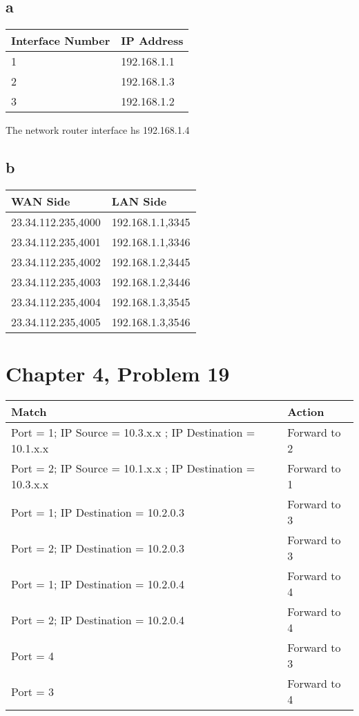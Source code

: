\documentclass{article}
\begin{document}
\subsection*{a}
\begin{tabular}{ |l|l| }
  \hline
  Interface Number & IP Address \\ \hline
      1 & 192.168.1.1 \\ \hline
      2 & 192.168.1.3 \\ \hline
      3 & 192.168.1.2 \\ \hline
\end{tabular}
\newline
The network router interface hs 192.168.1.4\\

\subsection*{b}
\begin{tabular}{ |l|l| }
  \hline
  WAN Side & LAN Side \\ \hline
      23.34.112.235,4000 & 192.168.1.1,3345 \\ \hline
      23.34.112.235,4001 & 192.168.1.1,3346 \\ \hline
      23.34.112.235,4002 & 192.168.1.2,3445 \\ \hline
      23.34.112.235,4003 & 192.168.1.2,3446 \\ \hline
      23.34.112.235,4004 & 192.168.1.3,3545 \\ \hline
      23.34.112.235,4005 & 192.168.1.3,3546 \\ \hline
\end{tabular}

\section*{Chapter 4, Problem 19}
\begin{tabular}{ |l|l| }
  \hline
  Match & Action \\ \hline
      Port = 1; IP Source = 10.3.x.x ; IP Destination = 10.1.x.x & Forward to 2 \\ \hline
      Port = 2; IP Source = 10.1.x.x ; IP Destination = 10.3.x.x & Forward to 1 \\ \hline
      Port = 1; IP Destination = 10.2.0.3 & Forward to 3 \\ \hline
      Port = 2; IP Destination = 10.2.0.3 & Forward to 3 \\ \hline
      Port = 1; IP Destination = 10.2.0.4 & Forward to 4 \\ \hline
      Port = 2; IP Destination = 10.2.0.4 & Forward to 4 \\ \hline
      Port = 4 & Forward to 3 \\ \hline
      Port = 3 & Forward to 4 \\ \hline
\end{tabular}
\end{document}
